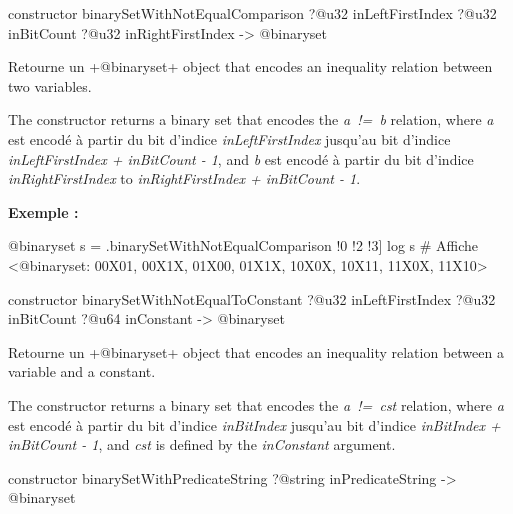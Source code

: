 
\begin{galgas4box}
constructor binarySetWithNotEqualComparison
  ?@u32 inLeftFirstIndex
  ?@u32 inBitCount
  ?@u32 inRightFirstIndex
  -> @binaryset
\end{galgas4box}



Retourne un \ggsq+@binaryset+ object that encodes an inequality relation between two variables.

The constructor returns a binary set that encodes the \emph{a~!=~b} relation, where \emph{a} est encodé à partir du bit d'indice \emph{inLeftFirstIndex} jusqu'au bit d'indice \emph{inLeftFirstIndex  + inBitCount - 1}, and \emph{b} est encodé à partir du bit d'indice \emph{inRightFirstIndex} to \emph{inRightFirstIndex + inBitCount - 1}.

\textbf{Exemple :}
\begin{galgas4}
@binaryset s = .binarySetWithNotEqualComparison !0 !2 !3]
log s # Affiche <@binaryset: 00X01, 00X1X, 01X00, 01X1X, 10X0X, 10X11, 11X0X, 11X10>
\end{galgas4}





\begin{galgas4box}
constructor binarySetWithNotEqualToConstant
  ?@u32 inLeftFirstIndex
  ?@u32 inBitCount
  ?@u64 inConstant
  -> @binaryset
\end{galgas4box}


Retourne un \ggsq+@binaryset+ object that encodes an inequality relation between a variable and a constant.

The constructor returns a binary set that encodes the \emph{a~!=~cst} relation, where \emph {a} est encodé à partir du bit d'indice \emph{inBitIndex} jusqu'au bit d'indice \emph{inBitIndex  + inBitCount - 1}, and \emph{cst} is defined by the \emph{inConstant} argument.








\begin{galgas4box}
constructor binarySetWithPredicateString ?@string inPredicateString -> @binaryset
\end{galgas4box}

